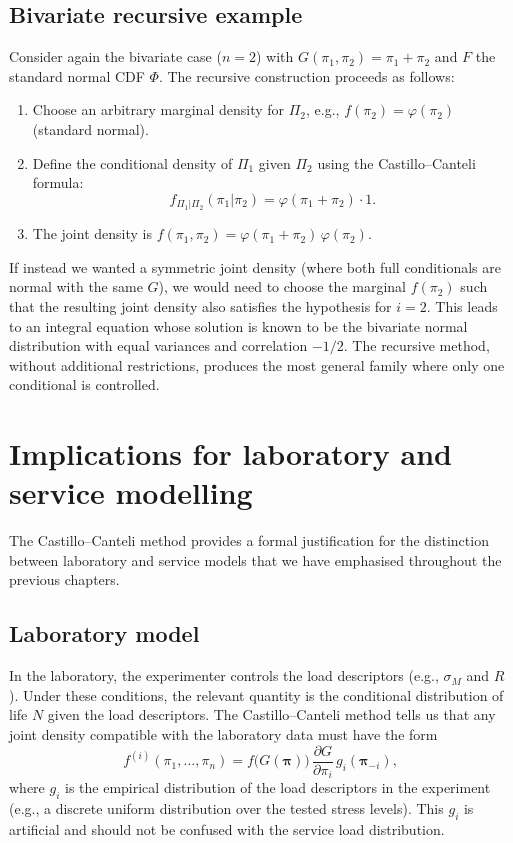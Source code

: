 \subsection{Bivariate recursive example}

Consider again the bivariate case (\(n=2\)) with \(G(\pi_1,\pi_2)=\pi_1+\pi_2\) and \(F\) the standard normal CDF \(\Phi\). The recursive construction proceeds as follows:

\begin{enumerate}
    \item Choose an arbitrary marginal density for \(\Pi_2\), e.g., \(f(\pi_2)=\varphi(\pi_2)\) (standard normal).
    \item Define the conditional density of \(\Pi_1\) given \(\Pi_2\) using the Castillo–Canteli formula:
    \[
    f_{\Pi_1|\Pi_2}(\pi_1|\pi_2) = \varphi(\pi_1+\pi_2)\cdot 1.
    \]
    \item The joint density is \(f(\pi_1,\pi_2)=\varphi(\pi_1+\pi_2)\,\varphi(\pi_2)\).
\end{enumerate}

If instead we wanted a symmetric joint density (where both full conditionals are normal with the same \(G\)), we would need to choose the marginal \(f(\pi_2)\) such that the resulting joint density also satisfies the hypothesis for \(i=2\). This leads to an integral equation whose solution is known to be the bivariate normal distribution with equal variances and correlation \(-1/2\). The recursive method, without additional restrictions, produces the most general family where only one conditional is controlled.

\section{Implications for laboratory and service modelling}
\label{sec:cc-lab-service}

The Castillo–Canteli method provides a formal justification for the distinction between laboratory and service models that we have emphasised throughout the previous chapters.

\subsection{Laboratory model}

In the laboratory, the experimenter controls the load descriptors (e.g., \(\sigma_M\) and \(R\)). Under these conditions, the relevant quantity is the conditional distribution of life \(N\) given the load descriptors. The Castillo–Canteli method tells us that any joint density compatible with the laboratory data must have the form
\[
f^{(i)}(\pi_1,\ldots,\pi_n) = f\bigl(G(\boldsymbol{\pi})\bigr)\,\frac{\partial G}{\partial\pi_i}\,g_i(\boldsymbol{\pi}_{-i}),
\]
where \(g_i\) is the empirical distribution of the load descriptors in the experiment (e.g., a discrete uniform distribution over the tested stress levels). This \(g_i\) is artificial and should not be confused with the service load distribution.

